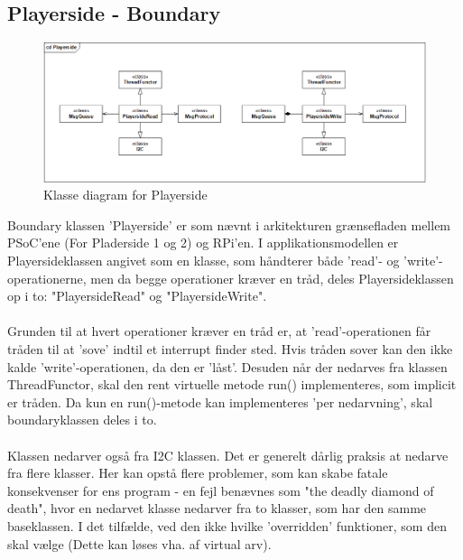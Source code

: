 \documentclass[Softwaredesign/Softwaredesign_main.tex]{subfiles}
\begin{document}
\subsection{Playerside - Boundary}
\begin{figure}[H]
    \centering
    \includegraphics[width=1\textwidth]{Softwaredesign/RPiApp/graphic_RPi/PS.png}
    \caption{Klasse diagram for Playerside}
   \label{fig:cd_PS}
\end{figure}
Boundary klassen 'Playerside' er som nævnt i arkitekturen grænsefladen mellem PSoC'ene (For Pladerside 1 og 2) og RPi'en. I applikationsmodellen er Playersideklassen angivet som en klasse, som håndterer både 'read'- og 'write'-operationerne, men da begge operationer kræver en tråd, deles Playersideklassen op i to: "PlayersideRead" og "PlayersideWrite". 
\\\\Grunden til at hvert operationer kræver en tråd er, at 'read'-operationen får tråden til at 'sove' indtil et interrupt finder sted. Hvis tråden sover kan den ikke kalde 'write'-operationen, da den er 'låst'. Desuden når der nedarves fra klassen ThreadFunctor, skal den rent virtuelle metode run() implementeres, som implicit er tråden. Da kun en run()-metode kan implementeres 'per nedarvning', skal boundaryklassen deles i to. \\\\
Klassen nedarver også fra I2C klassen. Det er generelt dårlig praksis at nedarve fra flere klasser. Her kan opstå flere problemer, som kan skabe fatale konsekvenser for ens program - en fejl benævnes som "the deadly diamond of death", hvor en nedarvet klasse nedarver fra to klasser, som har den samme baseklassen. I det tilfælde, ved den ikke hvilke 'overridden' funktioner, som den skal vælge (Dette kan løses vha. af virtual arv). 
\end{document}
